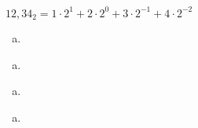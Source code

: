 \begin{esimerkki}
$12,34_2 = 1 \cdot 2^1 + 2 \cdot 2^0 + 3 \cdot 2^{-1} + 4 \cdot 2^{-2}$
\end{esimerkki}


\begin{tehtava}
	\begin{enumerate}[a)]
		\item
	\end{enumerate}
\begin{vastaus}
	\begin{enumerate}[a)]
		\item
	\end{enumerate}
\end{vastaus}
\end{tehtava}

\begin{tehtava}
	\begin{enumerate}[a)]
		\item
	\end{enumerate}
\begin{vastaus}
	\begin{enumerate}[a)]
		\item
	\end{enumerate}
\end{vastaus}
\end{tehtava}